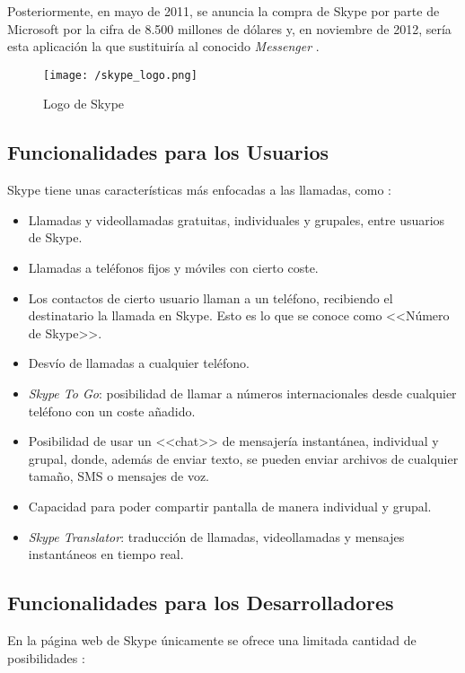 Posteriormente, en mayo de 2011, se anuncia la compra de Skype por parte de Microsoft por la cifra de 8.500 millones de dólares y, en noviembre de 2012, sería esta aplicación la que sustituiría al conocido \textit{Messenger} \cite{Ramirez2013}.

\begin{figure}[!h]
	\begin{center}
		\texttt{[image: /skype\_logo.png]}
		\caption{Logo de Skype}
		\label{fig:skype}
	\end{center}
\end{figure}

\subsection{Funcionalidades para los Usuarios}
Skype tiene unas características más enfocadas a las llamadas, como \cite{Skype2017}:

\begin{itemize}
	\item Llamadas y videollamadas gratuitas, individuales y grupales, entre usuarios de Skype.
	\item Llamadas a teléfonos fijos y móviles con cierto coste.
	\item Los contactos de cierto usuario llaman a un teléfono, recibiendo el destinatario la llamada en Skype. Esto es lo que se conoce como <<Número de Skype>>.
	\item Desvío de llamadas a cualquier teléfono.
	\item \textit{Skype To Go}: posibilidad de llamar a números internacionales desde cualquier teléfono con un coste añadido.
	\item Posibilidad de usar un <<chat>> de mensajería instantánea, individual y grupal, donde, además de enviar texto, se pueden enviar archivos de cualquier tamaño, \acf{SMS} o mensajes de voz.
	\item Capacidad para poder compartir pantalla de manera individual y grupal.
	\item \textit{Skype Translator}: traducción de llamadas, videollamadas y mensajes instantáneos en tiempo real.
\end{itemize}

\newpage

\subsection{Funcionalidades para los Desarrolladores}
En la página web de Skype únicamente se ofrece una limitada cantidad de posibilidades \cite{Skype2017a}:

